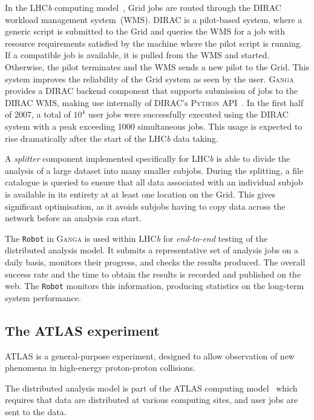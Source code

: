 \documentclass{elsart}
\def\lhcb {LHC{\em b\/}\xspace}
\def\dirac{DIRAC\xspace}
\def\atlas {ATLAS\xspace}
\def\ganga {\textsc{Ganga}\xspace}
\def\python {\textsc{Python}\xspace}
\def\grid {Grid\xspace}
\newcommand{\code}[1]{\texttt{#1}}
\begin{document}
In the \lhcb computing model~\cite{lhcb:2005jj}, \grid jobs are routed
through the
\dirac~\cite{DIRAC} workload management system~(WMS). \dirac is a pilot-based
system, where a generic script is submitted to the \grid and queries the
WMS for a job with resource requirements satisfied by the machine where the
pilot script is running.  If a compatible job is available, it is
pulled from the WMS
and started.  Otherwise, the pilot 
terminates and the WMS sends a new pilot to the \grid. This system 
improves the reliability of the \grid system as seen by the user. \ganga
provides a \dirac backend
component that supports submission of jobs to the \dirac
WMS, making use internally of \dirac's \python API~\cite{DIRACAPI}.
In the first half of 2007, a total of $10^4$ user jobs were successfully
executed using the \dirac system with a peak exceeding 1000 simultaneous
jobs.   This usage is expected to rise dramatically after the start of the
\lhcb data taking.


A \emph{splitter} component implemented specifically for \lhcb is able to divide
the
analysis of a large dataset into many smaller subjobs. During the splitting,
a file catalogue is queried to ensure that all data associated with an
individual subjob is
available in its entirety at at least one location on the \grid. This gives
significant optimisation, as it avoids subjobs having to copy data across the
network
before an analysis can start.

The \code{Robot} in \ganga is used within \lhcb for \emph{end-to-end} testing
of the distributed analysis model. It submits a representative set of
analysis jobs on a daily basis, monitors their progress, and checks 
the results produced. The overall success rate and the time to obtain
the results is recorded and published on the web. The
\code{Robot} monitors this information, producing statistics on the
long-term system performance.

\subsection{The \atlas experiment}
\label{sec:atlas}

\atlas is a general-purpose experiment, designed to allow observation of new
phenomena in high-energy proton-proton collisions.

The distributed analysis model is part of the \atlas computing
model~\cite{bib:atlascompmod} which requires that data are distributed at
various computing sites, and user jobs are sent to the data.
\end{document}
